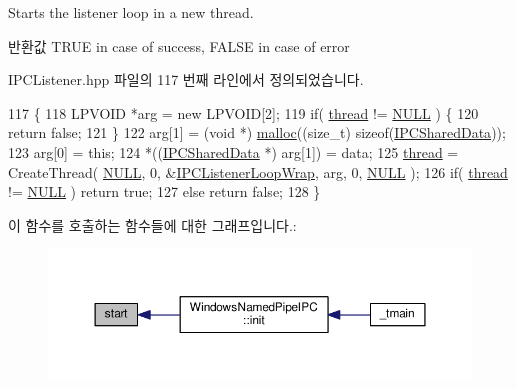 Starts the listener loop in a new thread. 

\begin{DoxyReturn}{반환값}
T\+R\+UE in case of success, F\+A\+L\+SE in case of error 
\end{DoxyReturn}


I\+P\+C\+Listener.\+hpp 파일의 117 번째 라인에서 정의되었습니다.


\begin{DoxyCode}
117                                      \{
118         LPVOID *arg = \textcolor{keyword}{new} LPVOID[2];
119         \textcolor{keywordflow}{if}( \hyperlink{class_stoppable_adf8b62c27edd1f6b7641bb7bb7f60275}{thread} != \hyperlink{openavb__types__base__pub_8h_a070d2ce7b6bb7e5c05602aa8c308d0c4}{NULL} ) \{
120             \textcolor{keywordflow}{return} \textcolor{keyword}{false};
121         \}
122         arg[1] = (\textcolor{keywordtype}{void} *) \hyperlink{_memory_leak_detector_malloc_macros_8h_ab8b25cd8f16d4a6552afe4e65c4f082d}{malloc}((\textcolor{keywordtype}{size\_t}) \textcolor{keyword}{sizeof}(\hyperlink{class_i_p_c_shared_data}{IPCSharedData}));
123         arg[0] = \textcolor{keyword}{this};
124         *((\hyperlink{class_i_p_c_shared_data}{IPCSharedData} *) arg[1]) = data;
125         \hyperlink{class_stoppable_adf8b62c27edd1f6b7641bb7bb7f60275}{thread} = CreateThread( \hyperlink{openavb__types__base__pub_8h_a070d2ce7b6bb7e5c05602aa8c308d0c4}{NULL}, 0, &\hyperlink{class_i_p_c_listener_a8417631db8279b7e41c87c5503c38a9e}{IPCListenerLoopWrap}, arg, 0, 
      \hyperlink{openavb__types__base__pub_8h_a070d2ce7b6bb7e5c05602aa8c308d0c4}{NULL} );
126         \textcolor{keywordflow}{if}( \hyperlink{class_stoppable_adf8b62c27edd1f6b7641bb7bb7f60275}{thread} != \hyperlink{openavb__types__base__pub_8h_a070d2ce7b6bb7e5c05602aa8c308d0c4}{NULL} ) \textcolor{keywordflow}{return} \textcolor{keyword}{true};
127         \textcolor{keywordflow}{else} \textcolor{keywordflow}{return} \textcolor{keyword}{false};
128     \}
\end{DoxyCode}


이 함수를 호출하는 함수들에 대한 그래프입니다.\+:
\nopagebreak
\begin{figure}[H]
\begin{center}
\leavevmode
\includegraphics[width=350pt]{class_i_p_c_listener_ad040984cedd269133c991f17be8808fc_icgraph}
\end{center}
\end{figure}



